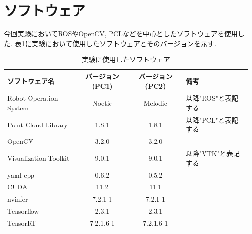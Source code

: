 \section{ソフトウェア}\label{sec:software}
今回実験においてROSやOpenCV, PCLなどを中心としたソフトウェアを使用した. 表\ref{tab:software}に実験において使用したソフトウェアとそのバージョンを示す.
\begin{table}[htbp]
\begin{center}
\caption{実験に使用したソフトウェア}
  \begin{tabular}{l|c|c|l} \hline
    ソフトウェア名 & バージョン(PC1) & バージョン(PC2) & 備考 \\ \hline
    Robot Operation System & Noetic & Melodic & 以降"ROS"と表記する\\
    Point Cloud Library &1.8.1 & 1.8.1 & 以降"PCL"と表記する\\
    OpenCV & 3.2.0 & 3.2.0 & \\
    Visualization Toolkit & 9.0.1 & 9.0.1 & 以降"VTK"と表記する\\
    yaml-cpp & 0.6.2 & 0.5.2 & \\
    CUDA & 11.2 & 11.1 & \\
    nvinfer & 7.2.1-1 & 7.2.1-1 & \\
    Tensorflow & 2.3.1 & 2.3.1 & \\
    TensorRT & 7.2.1.6-1 & 7.2.1.6-1 & \\ \hline
  \end{tabular}
  \label{tab:software}
\end{center}
\end{table}

